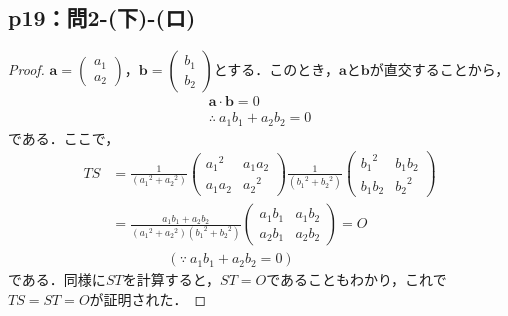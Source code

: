 \documentclass[a4paper,10pt,fleqn]{ltjsarticle}
\begin{document}
\subsection*{p19：問2-(下)-(ロ)}
\begin{tleftbar}
  \begin{proof}
    $\bm{a}=
      \begin{pmatrix}
        a_1 \\
        a_2
      \end{pmatrix}
    $，$\bm{b}=
      \begin{pmatrix}
        b_1 \\
        b_2
      \end{pmatrix}
    $とする．このとき，$\bm{a}$と$\bm{b}$が直交することから，
    \begin{gather*}
      \bm{a} \cdot \bm{b}=0 \\
      \therefore ~a_1 b_1 + a_2 b_2 =0
    \end{gather*}
    である．ここで，
    \begin{align*}
      TS & = \frac{1}{({a_1}^2 +{a_2}^2)}
      \begin{pmatrix}
        {a_1}^2 & a_1 a_2 \\
        a_1 a_2 & {a_2}^2
      \end{pmatrix}
      \frac{1}{({b_1}^2 +{b_2}^2)}
      \begin{pmatrix}
        {b_1}^2 & b_1 b_2 \\
        b_1 b_2 & {b_2}^2
      \end{pmatrix}
      \\
         & =\frac{a_1 b_1 + a_2 b_2}{({a_1}^2 +{a_2}^2)({b_1}^2 +{b_2}^2)}
      \begin{pmatrix}
        a_1 b_1 & a_1 b_2 \\
        a_2 b_1 & a_2 b_2
      \end{pmatrix}
      =O                                                                   \\
         & \qquad \qquad  (\because ~ a_1 b_1 + a_2 b_2 =0)
    \end{align*}
    である．同様に$ST$を計算すると，$ST=O$であることもわかり，これで$TS=ST=O$が証明された．
  \end{proof}
\end{tleftbar}
\end{document}
